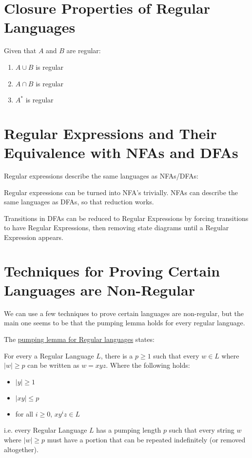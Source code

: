     \section{Closure Properties of Regular Languages}
        Given that $A$ and $B$ are regular:
        \begin{enumerate}
             \item $A \cup B$ is regular
             \item $A \cap B$ is regular
             \item $A^*$ is regular
         \end{enumerate}
    \section{Regular Expressions and Their Equivalence with NFAs and DFAs}
        Regular expressions describe the same languages as NFAs/DFAs:

        Regular expressions can be turned into NFA's trivially. NFAs can
        describe the same languages as DFAs, so that reduction works.

        Transitions in DFAs can be reduced to Regular Expressions by forcing
        transitions to have Regular Expressions, then removing state diagrams
        until a Regular Expression appears.
    \section{Techniques for Proving Certain Languages are Non-Regular}
        We can use a few techniques to prove certain languages are non-regular,
        but the main one seems to be that the pumping lemma holds for every
        regular language.

        The \uline{pumping lemma for Regular languages} states:

        For every a Regular Language $L$, there is a $p \ge 1$ such that every
        $w \in L$ where $|w| \ge p$ can be written as $w = xyz$. Where the
        following holds:
        \begin{itemize}
            \item $|y| \ge 1$
            \item $|xy| \le p$
            \item for all $i \ge 0$, $xy^iz \in L$
        \end{itemize}
        i.e. every Regular Language $L$ has a pumping length $p$ such that every
        string $w$ where $|w|\ge p$ must have a portion that can be repeated
        indefinitely (or removed altogether).

